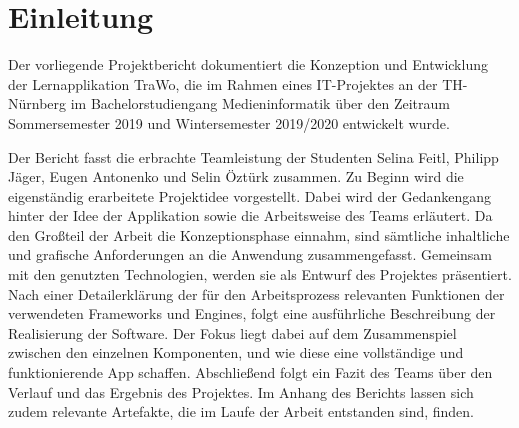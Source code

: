 \chapter{Einleitung}\label{ch:einleitung}
Der vorliegende Projektbericht dokumentiert die Konzeption und Entwicklung der Lernapplikation \glqq TraWo\grqq, die im Rahmen eines IT-Projektes an der TH-Nürnberg im Bachelorstudiengang Medieninformatik über den Zeitraum Sommersemester 2019 und Wintersemester 2019/2020 entwickelt wurde.

Der Bericht fasst die erbrachte Teamleistung der Studenten Selina Feitl, Philipp Jäger, Eugen Antonenko und Selin Öztürk zusammen. Zu Beginn wird die eigenständig erarbeitete Projektidee vorgestellt. Dabei wird der Gedankengang hinter der Idee der Applikation sowie die Arbeitsweise des Teams erläutert. 
Da den Großteil der Arbeit die Konzeptionsphase einnahm, sind sämtliche inhaltliche und grafische Anforderungen an die Anwendung zusammengefasst. Gemeinsam mit den genutzten Technologien, werden sie als Entwurf des Projektes präsentiert.
Nach einer Detailerklärung der für den Arbeitsprozess relevanten Funktionen der  verwendeten Frameworks und Engines, folgt eine ausführliche Beschreibung der Realisierung der Software. Der Fokus liegt dabei auf dem Zusammenspiel zwischen den einzelnen Komponenten, und wie diese eine vollständige und funktionierende App schaffen.
Abschließend folgt ein Fazit des Teams über den Verlauf und das Ergebnis des Projektes. Im Anhang des Berichts lassen sich zudem relevante Artefakte, die im Laufe der Arbeit entstanden sind, finden.

